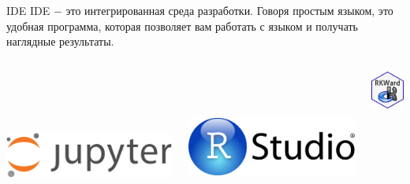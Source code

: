\documentclass[notes,12pt, aspectratio=169]{beamer}
\begin{document}
\begin{frame}{IDE}
	IDE $-$ это интегрированная среда разработки. Говоря простым языком, это удобная программа, которая позволяет вам работать с языком и получать наглядные результаты. 
	
\begin{columns}[T] %
	\begin{column}{.33\textwidth}
		\mbox{ } \\
		\mbox{ } \\
		\mbox{ } \\
		\mbox{ } \\
		\centering 	\includegraphics[width=.6\linewidth]{jupyter.png} 
	\end{column}%
	\hfill%
	\begin{column}{.33\textwidth}
		\mbox{ } \\
		\mbox{ } \\
		\mbox{ } \\
		\centering 	\includegraphics[width=.7\linewidth]{rstudio1.png} 		
	\end{column}%
	\hfill%
	\begin{column}{.33\textwidth}
		\centering 	\includegraphics[width=.6\linewidth]{rkward.png} \\
	\end{column}%
\end{columns}
\end{frame}
\end{document}
